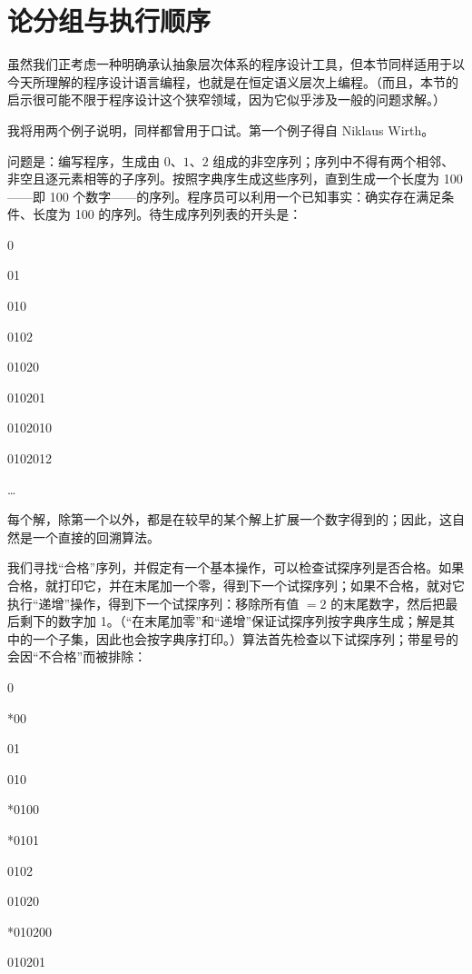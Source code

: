 \section[论分组与执行顺序]{论分组与执行顺序}
\label{sec:grouping-and-sequencing}

虽然我们正考虑一种明确承认抽象层次体系的程序设计工具，但本节同样适用于以今天所理解的程序设计语言编程，也就是在恒定语义层次上编程。（而且，本节的启示很可能不限于程序设计这个狭窄领域，因为它似乎涉及一般的问题求解。）

我将用两个例子说明，同样都曾用于口试。第一个例子得自 Niklaus Wirth。

问题是：编写程序，生成由 $0$、$1$、$2$ 组成的非空序列；序列中不得有两个相邻、非空且逐元素相等的子序列。按照字典序生成这些序列，直到生成一个长度为 100——即 100 个数字——的序列。程序员可以利用一个已知事实：确实存在满足条件、长度为 100 的序列。待生成序列列表的开头是：

0

01

010

0102

01020

010201

0102010

0102012

\dots

每个解，除第一个以外，都是在较早的某个解上扩展一个数字得到的；因此，这自然是一个直接的回溯算法。

我们寻找“合格”序列，并假定有一个基本操作，可以检查试探序列是否合格。如果合格，就打印它，并在末尾加一个零，得到下一个试探序列；如果不合格，就对它执行“递增”操作，得到下一个试探序列：移除所有值 $= 2$ 的末尾数字，然后把最后剩下的数字加 1。（“在末尾加零”和“递增”保证试探序列按字典序生成；解是其中的一个子集，因此也会按字典序打印。）算法首先检查以下试探序列；带星号的会因“不合格”而被排除：

\noindent
\tabto{\parindent}0

\noindent
*\tabto{\parindent}00

\noindent
\tabto{\parindent}01

\noindent
\tabto{\parindent}010

\noindent
*\tabto{\parindent}0100

\noindent
*\tabto{\parindent}0101

\noindent
\tabto{\parindent}0102

\noindent
\tabto{\parindent}01020

\noindent
*\tabto{\parindent}010200

\noindent
\tabto{\parindent}010201

